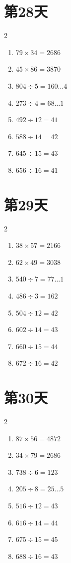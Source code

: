 \documentclass[12pt]{ctexart}
\begin{document}
	\section*{第28天}
	\begin{multicols}{2}
		\begin{enumerate}[itemsep=0pt]
			\item $79 \times 34 = 2686$
			\item $45 \times 86 = 3870$
			\item $804 \div 5 = 160\ldots 4$
			\item $273 \div 4 = 68\ldots 1$
			\item $492 \div 12 = 41$
			\item $588 \div 14 = 42$
			\item $645 \div 15 = 43$
			\item $656 \div 16 = 41$
		\end{enumerate}
	\end{multicols}
	
	\section*{第29天}
	\begin{multicols}{2}
		\begin{enumerate}[itemsep=0pt]
			\item $38 \times 57 = 2166$
			\item $62 \times 49 = 3038$
			\item $540 \div 7 = 77\ldots 1$
			\item $486 \div 3 = 162$
			\item $504 \div 12 = 42$
			\item $602 \div 14 = 43$
			\item $660 \div 15 = 44$
			\item $672 \div 16 = 42$
		\end{enumerate}
	\end{multicols}
	
	\section*{第30天}
	\begin{multicols}{2}
		\begin{enumerate}[itemsep=0pt]
			\item $87 \times 56 = 4872$
			\item $34 \times 79 = 2686$
			\item $738 \div 6 = 123$
			\item $205 \div 8 = 25\ldots 5$
			\item $516 \div 12 = 43$
			\item $616 \div 14 = 44$
			\item $675 \div 15 = 45$
			\item $688 \div 16 = 43$
		\end{enumerate}
	\end{multicols}
	
\end{document}
